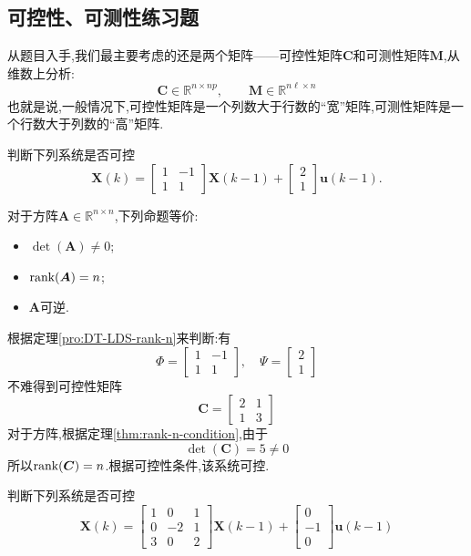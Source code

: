 \documentclass[cn,10pt,citestyle=gb7714-2015,bibstyle=gb7714-2015]{elegantbook}
\renewcommand{\l}{\ell}
\newcommand{\rank}{\textup{rank}}
\begin{document}
\subsection{可控性、可测性练习题}
从题目入手,我们最主要考虑的还是两个矩阵——可控性矩阵$\bm{C}$和可测性矩阵$\bm{M}$,从维数上分析:
\[
  \bm{C}\in\mathbb{R}^{n\times np},\qquad\bm{M}\in\mathbb{R}^{n\l\times n}
\]
也就是说,一般情况下,可控性矩阵是一个列数大于行数的“宽”矩阵,可测性矩阵是一个行数大于列数的“高”矩阵.
\begin{example}
  判断下列系统是否可控
  \[
    \bm{X}(k)=\begin{bmatrix}
      1&-1\\
      1&1
    \end{bmatrix}\bm{X}(k-1)+
    \begin{bmatrix}
      2\\
      1
    \end{bmatrix}\bm{u}(k-1).
  \]
\end{example}
\begin{theorem}[方阵满秩条件]\label{thm:rank-n-condition}
  对于方阵$\bm{A}\in\mathbb{R}^{n\times n}$,下列命题等价:
  \begin{itemize}
    \item $\det(\bm{A})\neq 0$;
    \item $\rank(\bm{A})=n$;
    \item $\bm{A}$可逆.
  \end{itemize}
\end{theorem}
\begin{solution}
  根据定理\ref{pro:DT-LDS-rank-n}来判断:有
  \[
    \bm{\varPhi}=\begin{bmatrix}
      1&-1\\
      1&1
    \end{bmatrix},\quad \bm{\varPsi}=\begin{bmatrix}
      2\\
      1
    \end{bmatrix}
  \]
  不难得到可控性矩阵
  \[
    \bm{C}=\begin{bmatrix}
      2&1\\
      1&3
    \end{bmatrix}
  \]
  对于方阵,根据定理\ref{thm:rank-n-condition},由于
  \[
    \det(\bm{C})=5\neq 0
  \]
  所以$\rank(\bm{C})=n$.根据可控性条件,该系统可控.
\end{solution}
\begin{example}\label{ex:controllability-1}
  判断下列系统是否可控
  \[
    \bm{X}(k)=\begin{bmatrix}
      1&0&1\\
      0&-2&1\\
      3&0&2
    \end{bmatrix}\bm{X}(k-1)+
    \begin{bmatrix}
      0\\
      -1\\
      0
    \end{bmatrix}\bm{u}(k-1)
  \]
\end{example}
\end{document}
